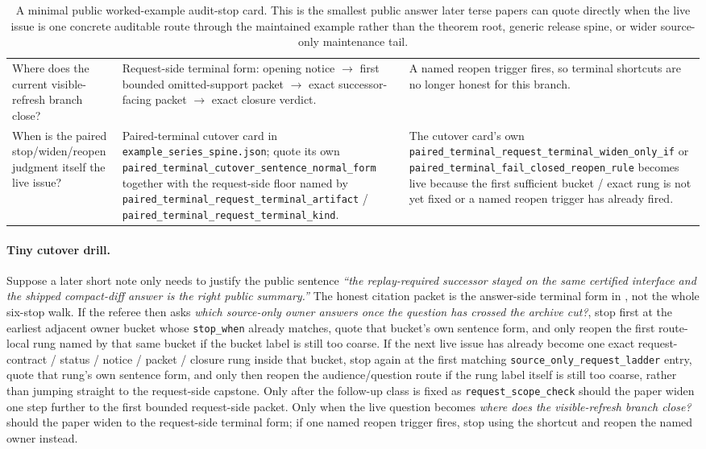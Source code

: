 \documentclass[11pt]{article}
\begin{document}
\begin{table}[t]
\begin{tabularx}{\linewidth}{@{}Y Y Y@{}}
Where does the current visible-refresh branch close? & Request-side terminal form: opening notice $\to$ first bounded omitted-support packet $\to$ exact successor-facing packet $\to$ exact closure verdict. & A named reopen trigger fires, so terminal shortcuts are no longer honest for this branch. \\
When is the paired stop/widen/reopen judgment itself the live issue? & Paired-terminal cutover card in \nolinkurl{example_series_spine.json}; quote its own \texttt{paired\_terminal\_cutover\_sentence\_normal\_form} together with the request-side floor named by \texttt{paired\_terminal\_request\_terminal\_artifact} / \texttt{paired\_terminal\_request\_terminal\_kind}. & The cutover card's own \texttt{paired\_terminal\_request\_terminal\_widen\_only\_if} or \texttt{paired\_terminal\_fail\_closed\_reopen\_rule} becomes live because the first sufficient bucket / exact rung is not yet fixed or a named reopen trigger has already fired. \\
\bottomrule
\end{tabularx}
\caption{A minimal public worked-example audit-stop card. This is the smallest public answer later terse papers can quote directly when the live issue is one concrete auditable route through the maintained example rather than the theorem root, generic release spine, or wider source-only maintenance tail.}
\label{tab:workedexample-mincard}
\end{table}

\paragraph{Tiny cutover drill.}
Suppose a later short note only needs to justify the public sentence \emph{``the replay-required successor stayed on the same certified interface and the shipped compact-diff answer is the right public summary.''} The honest citation packet is the answer-side terminal form in , not the whole six-stop walk. If the referee then asks \emph{which source-only owner answers once the question has crossed the archive cut?}, stop first at the earliest adjacent owner bucket whose \texttt{stop\_when} already matches, quote that bucket's own sentence form, and only reopen the first route-local rung named by that same bucket if the bucket label is still too coarse. If the next live issue has already become one exact request-contract / status / notice / packet / closure rung inside that bucket, stop again at the first matching \texttt{source\_only\_request\_ladder} entry, quote that rung's own sentence form, and only then reopen the audience/question route if the rung label itself is still too coarse, rather than jumping straight to the request-side capstone. Only after the follow-up class is fixed as \texttt{request\_scope\_check} should the paper widen one step further to the first bounded request-side packet. Only when the live question becomes \emph{where does the visible-refresh branch close?} should the paper widen to the request-side terminal form; if one named reopen trigger fires, stop using the shortcut and reopen the named owner instead.
\end{document}
